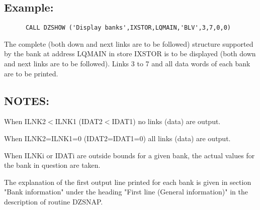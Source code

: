 \subsection{Example:}
\begin{verbatim}
      CALL DZSHOW ('Display banks',IXSTOR,LQMAIN,'BLV',3,7,0,0)
\end{verbatim}
The complete (both down and next links are to be followed)
structure supported by the bank
at address LQMAIN in  store IXSTOR is to
be displayed (both down and next links are to be followed).
Links 3 to 7 and all data words of each bank are to be printed.
\subsection{NOTES:}
\par
\begin{OL}
\item When ILNK2$<$ILNK1 (IDAT2$<$IDAT1) no links (data) are output.
\item When ILNK2=ILNK1=0 (IDAT2=IDAT1=0) all links (data) are output.
\item When ILNKi or IDATi are outside bounds for a given bank,
the actual values for the bank in question are taken.
\item The explanation of the first output line printed for each bank
is given in section "Bank information"
under the heading "First line (General information)" in the
description of routine DZSNAP.
\end{OL}
